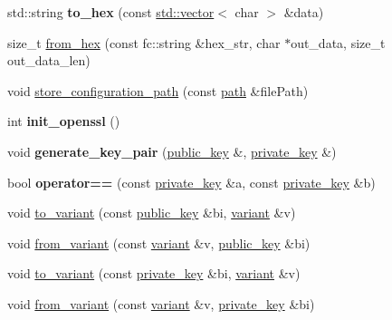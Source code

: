 \begin{DoxyCompactItemize}
\mbox{\label{namespacefc_a4b5763cec58ad289f6668a00b42793a4}} 
std\+::string {\bfseries to\+\_\+hex} (const \mbox{\hyperlink{classstd_1_1vector}{std\+::vector}}$<$ char $>$ \&data)
\item 
size\+\_\+t \mbox{\hyperlink{namespacefc_a9f13171c9f0aa7238c3369325df52c1e}{from\+\_\+hex}} (const fc\+::string \&hex\+\_\+str, char $\ast$out\+\_\+data, size\+\_\+t out\+\_\+data\+\_\+len)
\item 
void \mbox{\hyperlink{namespacefc_ab3fe255763535cb35384ce63a6514739}{store\+\_\+configuration\+\_\+path}} (const \mbox{\hyperlink{classfc_1_1path}{path}} \&file\+Path)
\item 
\mbox{\label{namespacefc_a5bf0ca50d51c3ac0f7a0e182bab7d234}} 
int {\bfseries init\+\_\+openssl} ()
\item 
\mbox{\label{namespacefc_a67ed4716caa83d3a2b3f7e20f10494c8}} 
void {\bfseries generate\+\_\+key\+\_\+pair} (\mbox{\hyperlink{classfc_1_1public__key}{public\+\_\+key}} \&, \mbox{\hyperlink{classfc_1_1private__key}{private\+\_\+key}} \&)
\item 
\mbox{\label{namespacefc_a7ccc0c376d8c3e4872ceea8b1e79ee23}} 
bool {\bfseries operator==} (const \mbox{\hyperlink{classfc_1_1private__key}{private\+\_\+key}} \&a, const \mbox{\hyperlink{classfc_1_1private__key}{private\+\_\+key}} \&b)
\item 
void \mbox{\hyperlink{namespacefc_a25119a8943ec18e6a5b0e0f47b62a94c}{to\+\_\+variant}} (const \mbox{\hyperlink{classfc_1_1public__key}{public\+\_\+key}} \&bi, \mbox{\hyperlink{classfc_1_1variant}{variant}} \&v)
\item 
void \mbox{\hyperlink{namespacefc_a24f4bac64e6b14a6c3fd1a9bbd714508}{from\+\_\+variant}} (const \mbox{\hyperlink{classfc_1_1variant}{variant}} \&v, \mbox{\hyperlink{classfc_1_1public__key}{public\+\_\+key}} \&bi)
\item 
void \mbox{\hyperlink{namespacefc_a7e0370298d2b97fba3993cb772749c6a}{to\+\_\+variant}} (const \mbox{\hyperlink{classfc_1_1private__key}{private\+\_\+key}} \&bi, \mbox{\hyperlink{classfc_1_1variant}{variant}} \&v)
\item 
void \mbox{\hyperlink{namespacefc_a535eb59ca95c338b156a7ede0dea3e98}{from\+\_\+variant}} (const \mbox{\hyperlink{classfc_1_1variant}{variant}} \&v, \mbox{\hyperlink{classfc_1_1private__key}{private\+\_\+key}} \&bi)

\end{DoxyCompactItemize}
